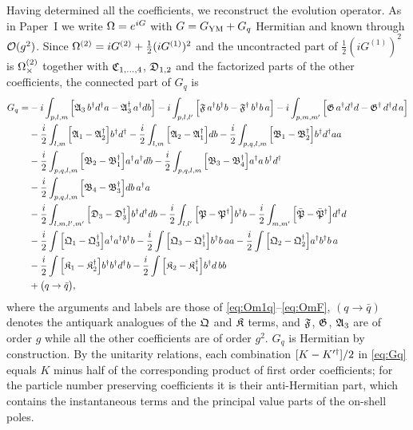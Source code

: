 Having determined all the coefficients, we reconstruct the evolution operator. As in Paper~I we
write $\Omega=e^{iG}$ with $G=G_{\rm YM}+G_{q}$ Hermitian and known through $\mathcal{O}(g^{2})$. Since
$\Omega^{(2)}=iG^{(2)}+\tfrac12(iG^{(1)})^{2}$ and the uncontracted part of $\tfrac12(iG^{(1)})^{2}$ is
$\Omega^{(2)}_{\times}$ together with $\mathfrak{C}_{1,\dots,4}$, $\mathfrak{D}_{1,2}$ and the factorized parts of the other
coefficients, the connected part of $G_{q}$ is
\begin{align}
G_{q}=&-i\int_{p,l,m}\Big[\mathfrak{A}_{3}\,b^{\dagger}d^{\dagger}a-\mathfrak{A}_{3}^{\dagger}\,a^{\dagger}db\Big]
-i\int_{p,l,l'}\Big[\mathfrak{F}\,a^{\dagger}b^{\dagger}b-\mathfrak{F}^{\dagger}\,b^{\dagger}b\,a\Big]
-i\int_{p,m,m'}\Big[\mathfrak{G}\,a^{\dagger}d^{\dagger}d-\mathfrak{G}^{\dagger}\,d^{\dagger}d\,a\Big]
\nonumber\\
&-\frac{i}{2}\int_{l,m}\Big[\mathfrak{A}_{1}-\mathfrak{A}_{2}^{\dagger}\Big]b^{\dagger}d^{\dagger}
-\frac{i}{2}\int_{l,m}\Big[\mathfrak{A}_{2}-\mathfrak{A}_{1}^{\dagger}\Big]db
-\frac{i}{2}\int_{p,q,l,m}\Big[\mathfrak{B}_{1}-\mathfrak{B}_{2}^{\dagger}\Big]b^{\dagger}d^{\dagger}aa
\nonumber\\
&-\frac{i}{2}\int_{p,q,l,m}\Big[\mathfrak{B}_{2}-\mathfrak{B}_{1}^{\dagger}\Big]a^{\dagger}a^{\dagger}db
-\frac{i}{2}\int_{p,q,l,m}\Big[\mathfrak{B}_{3}-\mathfrak{B}_{4}^{\dagger}\Big]a^{\dagger}a\,b^{\dagger}d^{\dagger}
\nonumber\\
&-\frac{i}{2}\int_{p,q,l,m}\Big[\mathfrak{B}_{4}-\mathfrak{B}_{3}^{\dagger}\Big]db\,a^{\dagger}a
\nonumber\\
&-\frac{i}{2}\int_{l,m,l',m'}\Big[\mathfrak{D}_{3}-\mathfrak{D}_{3}^{\dagger}\Big]b^{\dagger}d^{\dagger}db
-\frac{i}{2}\int_{l,l'}\Big[\mathfrak{P}-\mathfrak{P}^{\dagger}\Big]b^{\dagger}b
-\frac{i}{2}\int_{m,m'}\Big[\bar{\mathfrak{P}}-\bar{\mathfrak{P}}^{\dagger}\Big]d^{\dagger}d
\nonumber\\
&-\frac{i}{2}\int\Big[\mathfrak{Q}_{1}-\mathfrak{Q}_{3}^{\dagger}\Big]a^{\dagger}a^{\dagger}b^{\dagger}b
-\frac{i}{2}\int\Big[\mathfrak{Q}_{3}-\mathfrak{Q}_{1}^{\dagger}\Big]b^{\dagger}b\,aa
-\frac{i}{2}\int\Big[\mathfrak{Q}_{2}-\mathfrak{Q}_{2}^{\dagger}\Big]a^{\dagger}b^{\dagger}b\,a
\nonumber\\
&-\frac{i}{2}\int\Big[\mathfrak{K}_{1}-\mathfrak{K}_{2}^{\dagger}\Big]b^{\dagger}b^{\dagger}d^{\dagger}b
-\frac{i}{2}\int\Big[\mathfrak{K}_{2}-\mathfrak{K}_{1}^{\dagger}\Big]b^{\dagger}d\,bb
\nonumber\\
&+\big(q\to\bar q\big),
\label{eq:Gq}
\end{align}
where the arguments and labels are those of \eqref{eq:Om1q}--\eqref{eq:OmF}, $(q\to\bar q)$ denotes the
antiquark analogues of the $\mathfrak{Q}$ and $\mathfrak{K}$ terms, and $\mathfrak{F}$, $\mathfrak{G}$, $\mathfrak{A}_{3}$ are of order $g$ while
all the other coefficients are of order $g^{2}$. $G_{q}$ is Hermitian by construction. By the
unitarity relations, each combination $[K-K'^{\dagger}]/2$ in \eqref{eq:Gq} equals $K$ minus half of the
corresponding product of first order coefficients; for the particle number preserving coefficients
it is their anti-Hermitian part, which contains the instantaneous terms and the principal value
parts of the on-shell poles.
